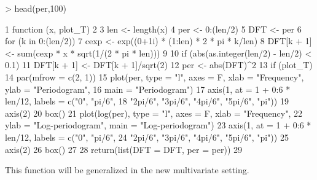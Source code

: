 \documentclass[a4paper]{book}
\begin{document}
\begin{Schunk}
\begin{Sinput}
> head(per,100)
\end{Sinput}
\begin{Soutput}
1  function (x, plot_T)                                                              
2  {                                                                                 
3      len <- length(x)                                                              
4      per <- 0:(len/2)                                                              
5      DFT <- per                                                                    
6      for (k in 0:(len/2)) {                                                        
7          cexp <- exp((0+1i) * (1:len) * 2 * pi * k/len)                            
8          DFT[k + 1] <- sum(cexp * x * sqrt(1/(2 * pi * len)))                      
9      }                                                                             
10     if (abs(as.integer(len/2) - len/2) < 0.1)                                     
11         DFT[k + 1] <- DFT[k + 1]/sqrt(2)                                          
12     per <- abs(DFT)^2                                                             
13     if (plot_T) {                                                                 
14         par(mfrow = c(2, 1))                                                      
15         plot(per, type = "l", axes = F, xlab = "Frequency", ylab = "Periodogram", 
16             main = "Periodogram")                                                 
17         axis(1, at = 1 + 0:6 * len/12, labels = c("0", "pi/6",                    
18             "2pi/6", "3pi/6", "4pi/6", "5pi/6", "pi"))                            
19         axis(2)                                                                   
20         box()                                                                     
21         plot(log(per), type = "l", axes = F, xlab = "Frequency",                  
22             ylab = "Log-periodogram", main = "Log-periodogram")                   
23         axis(1, at = 1 + 0:6 * len/12, labels = c("0", "pi/6",                    
24             "2pi/6", "3pi/6", "4pi/6", "5pi/6", "pi"))                            
25         axis(2)                                                                   
26         box()                                                                     
27     }                                                                             
28     return(list(DFT = DFT, per = per))                                            
29 }                                                                                 
\end{Soutput}
\end{Schunk}
This function will be generalized in the new multivariate setting.
\end{document}
